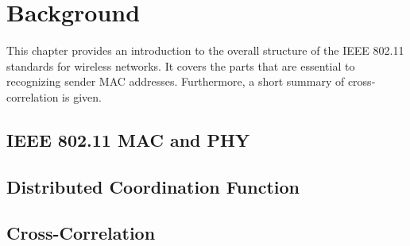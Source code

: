 
\chapter{Background}\label{ch:relatedwork}
\glsresetall %

This chapter provides an introduction to the overall structure of the IEEE 802.11 standards for wireless networks. It covers the parts that are essential to recognizing sender MAC addresses. Furthermore, a short summary of cross-correlation is given.



\section{IEEE 802.11 MAC and PHY}



\section{Distributed Coordination Function}



\section{Cross-Correlation}
